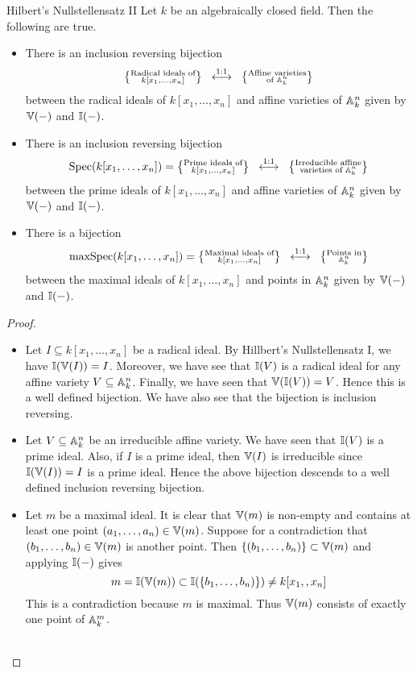 \documentclass[a4paper]{article}
\begin{document}
\begin{thm}{Hilbert's Nullstellensatz II}{} Let $k$ be an algebraically closed field. Then the following are true. 
\begin{itemize}
\item There is an inclusion reversing bijection $$\left\{\substack{\text{Radical ideals of}\\ k[x_1,\dots,x_n]}\right\}\;\;\overset{\text{1:1}}{\longleftrightarrow}\;\;\left\{\substack{\text{Affine varieties}\\\text{of }\mathbb{A}_k^n}\right\}$$ between the radical ideals of $k[x_1,\dots,x_n]$ and affine varieties of $\mathbb{A}_k^n$ given by $\mathbb{V}(-)$ and $\mathbb{I}(-)$. 
\item There is an inclusion reversing bijection $$\text{Spec}(k[x_1,\dots,x_n])=\left\{\substack{\text{Prime ideals of}\\ k[x_1,\dots,x_n]}\right\}\;\;\overset{\text{1:1}}{\longleftrightarrow}\;\;\left\{\substack{\text{Irreducible affine}\\\text{varieties of }\mathbb{A}_k^n}\right\}$$ between the prime ideals of $k[x_1,\dots,x_n]$ and affine varieties of $\mathbb{A}_k^n$ given by $\mathbb{V}(-)$ and $\mathbb{I}(-)$. 
\item There is a bijection $$\text{maxSpec}(k[x_1,\dots,x_n])=\left\{\substack{\text{Maximal ideals of}\\ k[x_1,\dots,x_n]}\right\}\;\;\overset{\text{1:1}}{\longleftrightarrow}\;\;\left\{\substack{\text{Points in}\\\mathbb{A}_k^n}\right\}$$ between the maximal ideals of $k[x_1,\dots,x_n]$ and points in $\mathbb{A}_k^n$ given by $\mathbb{V}(-)$ and $\mathbb{I}(-)$. 
\end{itemize} \tcbline
\begin{proof}~\\
\begin{itemize}
\item Let $I\subseteq k[x_1,\dots,x_n]$ be a radical ideal. By Hillbert's Nullstellensatz I, we have $\mathbb{I}(\mathbb{V}(I))=I$. Moreover, we have see that $\mathbb{I}(V)$ is a radical ideal for any affine variety $V\subseteq\mathbb{A}_k^n$. Finally, we have seen that $\mathbb{V}(\mathbb{I}(V))=V$. Hence this is a well defined bijection. We have also see that the bijection is inclusion reversing. 
\item Let $V\subseteq\mathbb{A}_k^n$ be an irreducible affine variety. We have seen that $\mathbb{I}(V)$ is a prime ideal. Also, if $I$ is a prime ideal, then $\mathbb{V}(I)$ is irreducible since $\mathbb{I}(\mathbb{V}(I))=I$ is a prime ideal. Hence the above bijection descends to a well defined inclusion reversing bijection. 
\item Let $m$ be a maximal ideal. It is clear that $\mathbb{V}(m)$ is non-empty and contains at least one point $(a_1,\dots,a_n)\in\mathbb{V}(m)$. Suppose for a contradiction that $(b_1,\dots,b_n)\in\mathbb{V}(m)$ is another point. Then $\{(b_1,\dots,b_n)\}\subset\mathbb{V}(m)$ and applying $\mathbb{I}(-)$ gives $$m=\I(\V(m))\subset\I(\{b_1,\dots,b_n)\})\neq k[x_1,\do,x_n]$$ This is a contradiction because $m$ is maximal. Thus $\mathbb{V}(m)$ consists of exactly one point of $\mathbb{A}_k^m$. \\~\\


\end{itemize}
\end{proof}
\end{thm}
\end{document}
